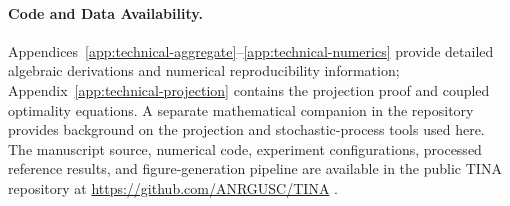 \documentclass[11pt]{article}
\begin{document}
\paragraph{Code and Data Availability.}
Appendices~\ref{app:technical-aggregate}--\ref{app:technical-numerics} provide detailed algebraic
derivations and numerical reproducibility information;
Appendix~\ref{app:technical-projection} contains the projection proof and
coupled optimality equations. A separate mathematical
companion in the repository provides background on the projection and
stochastic-process tools used here.
The manuscript source, numerical code, experiment configurations, processed
reference results, and figure-generation pipeline are available in the public
TINA repository at \url{https://github.com/ANRGUSC/TINA}
\cite{tina2026software}.




\appendix
{}

\end{document}
